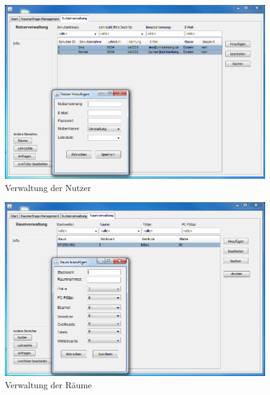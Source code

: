 \begin{figure}[H]
\begin{center}
\includegraphics[width=150mm]{images/section_7/VerwaltungNutzerverwaltung.PNG}
\caption{Verwaltung der Nutzer}
\label{img:NutzerVerw}
\end{center}
\end{figure}

\begin{figure}[H]
\begin{center}
\includegraphics[width=150mm]{images/section_7/VerwaltungRaumverwaltung.PNG}
\caption{Verwaltung der Räume}
\label{img:RaumVerw}
\end{center}
\end{figure}


